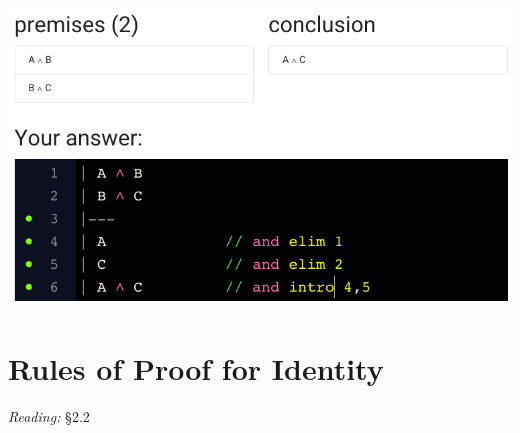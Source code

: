 \documentclass[12pt]{extarticle}
\begin{document}
\begin{multicols*}{3}
\begin{center}
\includegraphics[scale=0.3]{img/151024-0010-crop.png}
\end{center}
 
 
\section{Rules of Proof for Identity}
 
\emph{Reading:} §2.2
 

\end{multicols*}
\end{document}
